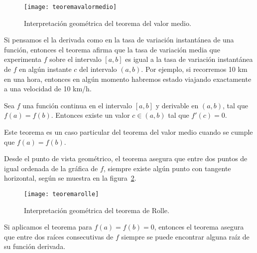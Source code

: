 \documentclass[a4paper]{article}
\begin{document}
\begin{figure}[h!]
\centering
\texttt{[image: teoremavalormedio]}
\caption{Interpretación geométrica del teorema del valor medio.}
\label{g:teorema valor medio}
\end{figure}

Si pensamos el la derivada como en la tasa de variación instantánea de una función, entonces el teorema afirma que la tasa de variación media que experimenta $f$ sobre el intervalo $[a,b]$ es igual a la tasa de variación instantánea de $f$ en algún instante $c$ del intervalo $(a,b)$. Por ejemplo, si recorremos 10 km en una hora, entonces en algún momento habremos estado viajando exactamente a una velocidad de 10 km/h.

\begin{teorema}[Rolle]
Sea $f$  una función continua en el intervalo $[a,b]$ y derivable en $(a,b)$, tal que $f(a)=f(b)$. Entonces existe un valor $c\in(a,b)$ tal que $f'(c)=0$.
\end{teorema}

Este teorema es un caso particular del teorema del valor medio cuando se cumple que $f(a)=f(b)$.

Desde el punto de vista geométrico, el teorema asegura que entre dos puntos de igual ordenada de la gráfica de $f$, siempre existe algún punto con tangente horizontal, según se muestra en la figura~\ref{g:teorema rolle}.

\begin{figure}[h!]
\centering
\texttt{[image: teoremarolle]}
\caption{Interpretación geométrica del teorema de Rolle.}
\label{g:teorema rolle}
\end{figure}

Si aplicamos el teorema para $f(a)=f(b)=0$, entonces el teorema asegura que entre dos raíces consecutivas de $f$ siempre se puede encontrar alguna raíz de su función derivada.
\end{document}
